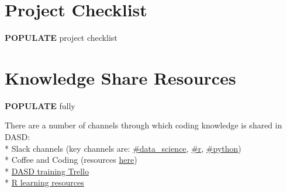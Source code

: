 \documentclass[]{book}
\begin{document}
\hypertarget{checklist}{%
\chapter{Project Checklist}\label{checklist}}

\textbf{POPULATE} project checklist

\hypertarget{ksresources}{%
\chapter{Knowledge Share Resources}\label{ksresources}}

\textbf{POPULATE} fully

There are a number of channels through which coding knowledge is shared in DASD:\\
* Slack channels (key channels are: \href{https://app.slack.com/client/T1PU1AP6D/C1Z8Q18LS}{\#data\_science}, \href{https://app.slack.com/client/T1PU1AP6D/C1PUCG719}{\#r}, \href{https://app.slack.com/client/T1PU1AP6D/C1Q09V86S}{\#python})\\
* Coffee and Coding (resources \href{https://github.com/moj-analytical-services/Coffee-and-Coding}{here})\\
* \href{https://trello.com/b/zAwm6sCc/dasd-training}{DASD training Trello}\\
* \href{https://docs.google.com/document/d/1R4hBMf26T9HEnCdVz56PpZhwiCv5RhberYL3BxOSKsA/edit}{R learning resources}
\end{document}
